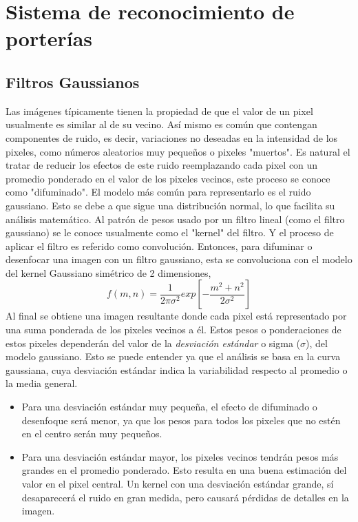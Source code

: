 \chapter{Sistema de reconocimiento de porterías}\label{sec:porteria}

\section{Filtros Gaussianos}
Las imágenes típicamente tienen la propiedad de que el valor de un pixel usualmente es similar al de su vecino. Así mismo es común que contengan componentes de ruido, es decir, variaciones no deseadas en la intensidad de los pixeles, como números aleatorios muy pequeños o pixeles "muertos". Es natural el tratar de reducir los efectos de este ruido reemplazando cada pixel con un promedio ponderado en el valor de los pixeles vecinos, este proceso se conoce como "difuminado".  El modelo más común para representarlo es el ruido gaussiano. Esto se debe a que sigue una distribución normal, lo que facilita su análisis matemático. Al patrón de pesos usado por un filtro lineal (como el filtro gaussiano) se le conoce usualmente como el "kernel" del filtro. Y el proceso de aplicar el filtro es referido como convolución.\cite{forsyth2002computer} Entonces, para difuminar o desenfocar una imagen con un filtro gaussiano, esta se convoluciona con el modelo del kernel Gaussiano simétrico de 2 dimensiones, 
\begin{equation}
\label{eq:pythagorean}
f(m,n)=\frac{1}{2\pi \sigma^2}exp[-\frac{m^2+n^2}{2\sigma^2} ]
\end{equation}
Al final se obtiene una imagen resultante donde cada pixel está representado por una suma ponderada de los pixeles vecinos a él. Estos pesos o ponderaciones de estos pixeles dependerán del valor de la \textit{desviación estándar} o sigma ($\sigma$), del modelo gaussiano.\cite{prince2012computer} Esto se puede entender ya que el análisis se basa en la curva gaussiana, cuya desviación estándar indica la variabilidad respecto al promedio o la media general.
\begin{itemize}
	\item Para una desviación estándar muy pequeña, el efecto de difuminado o desenfoque será menor, ya que los pesos para todos los pixeles que no estén en el centro serán muy pequeños.
	\item Para una desviación estándar mayor, los pixeles vecinos tendrán pesos más grandes en el promedio ponderado. Esto resulta en una buena estimación del valor en el pixel central. Un kernel con una desviación estándar grande, sí desaparecerá el ruido en gran medida, pero causará pérdidas de detalles en la imagen.\cite{forsyth2002computer}
\end{itemize}

